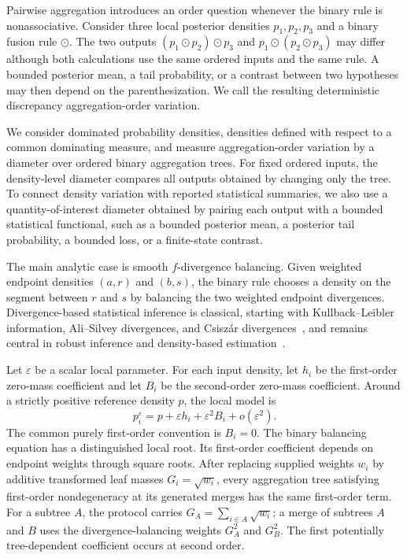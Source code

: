 \documentclass[11pt]{article}
\theoremstyle{plain}
\theoremstyle{definition}
\theoremstyle{definition}
\newcommand{\eps}{\varepsilon}
\newcommand{\op}{\odot}
\newcommand*\ie{\text{i.e.,\,}{}}
\begin{document}
Pairwise aggregation introduces an order question whenever the binary rule is nonassociative. Consider three local posterior densities $p_1,p_2,p_3$ and a binary fusion rule $\op$. The two outputs $(p_1\op p_2)\op p_3$ and $p_1\op(p_2\op p_3)$ may differ although both calculations use the same ordered inputs and the same rule. A bounded posterior mean, a tail probability, or a contrast between two hypotheses may then depend on the parenthesization. We call the resulting deterministic discrepancy aggregation-order variation.

We consider dominated probability densities, \ie densities defined with respect to a common dominating measure, and measure aggregation-order variation by a diameter over ordered binary aggregation trees. For fixed ordered inputs, the density-level diameter compares all outputs obtained by changing only the tree. To connect density variation with reported statistical summaries, we also use a quantity-of-interest diameter obtained by pairing each output with a bounded statistical functional, such as a bounded posterior mean, a posterior tail probability, a bounded loss, or a finite-state contrast.

The main analytic case is smooth $f$-divergence balancing. Given weighted endpoint densities $(a,r)$ and $(b,s)$, the binary rule chooses a density on the segment between $r$ and $s$ by balancing the two weighted endpoint divergences. Divergence-based statistical inference is classical, starting with Kullback--Leibler information, Ali--Silvey divergences, and Csisz\'ar divergences~\cite{kullback1951information,ali1966general,csiszar1967information}, and remains central in robust inference and density-based estimation~\cite{singh2021robust}. 

Let $\eps$ be a scalar local parameter. For each input density, let $h_i$ be the first-order zero-mass coefficient and let $B_i$ be the second-order zero-mass coefficient. Around a strictly positive reference density $p$, the local model is
\[p_i^\eps=p+\eps h_i+\eps^2B_i+o(\eps^2).\]
The common purely first-order convention is $B_i=0$. The binary balancing equation has a distinguished local root. Its first-order coefficient depends on endpoint weights through square roots. After replacing supplied weights $w_i$ by additive transformed leaf masses $G_i=\sqrt{w_i}$, every aggregation tree satisfying first-order nondegeneracy at its generated merges has the same first-order term. For a subtree $A$, the protocol carries $G_A=\sum_{i\in A}\sqrt{w_i}$; a merge of subtrees $A$ and $B$ uses the divergence-balancing weights $G_A^2$ and $G_B^2$. The first potentially tree-dependent coefficient occurs at second order.
\end{document}
